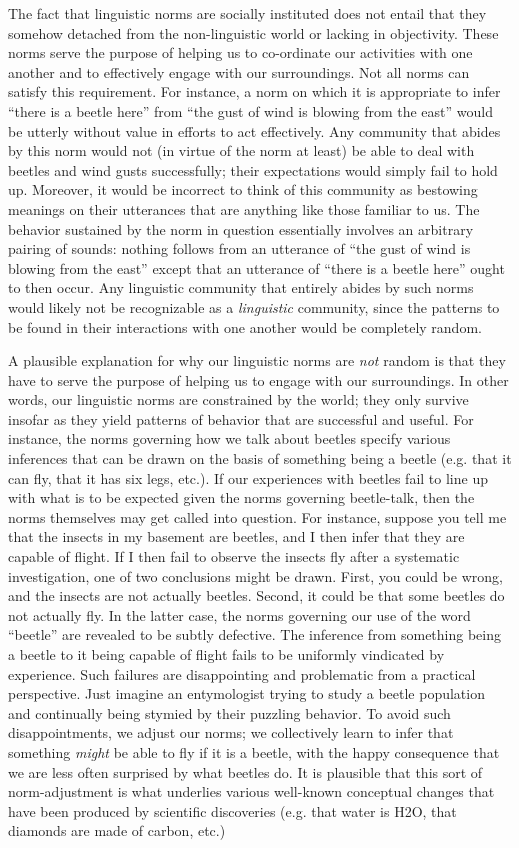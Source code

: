 The fact that linguistic norms are socially instituted does not entail that they somehow detached from the non-linguistic world or lacking in objectivity. These norms serve the purpose of helping us to co-ordinate our activities with one another and to effectively engage with our surroundings. Not all norms can satisfy this requirement. For instance, a norm on which it is appropriate to infer ``there is a beetle here'' from ``the gust of wind is blowing from the east'' would be utterly without value in efforts to act effectively. Any community that abides by this norm would not (in virtue of the norm at least) be able to deal with beetles and wind gusts successfully; their expectations would simply fail to hold up. Moreover, it would be incorrect to think of this community as bestowing meanings on their utterances that are anything like those familiar to us. The behavior sustained by the norm in question essentially involves an arbitrary pairing of sounds: nothing follows from an utterance of ``the gust of wind is blowing from the east'' except that an utterance of ``there is a beetle here'' ought to then occur. Any linguistic community that entirely abides by such norms would likely not be recognizable as a \textit{linguistic} community, since the patterns to be found in their interactions with one another would be completely random. 

A plausible explanation for why our linguistic norms are \textit{not} random is that they have to serve the purpose of helping us to engage with our surroundings. In other words, our linguistic norms are constrained by the world; they only survive insofar as they yield patterns of behavior that are successful and useful. For instance, the norms governing how we talk about beetles specify various inferences that can be drawn on the basis of something being a beetle (e.g. that it can fly, that it has six legs, etc.). If our experiences with beetles fail to line up with what is to be expected given the norms governing beetle-talk, then the norms themselves may get called into question. For instance, suppose you tell me that the insects in my basement are beetles, and I then infer that they are capable of flight. If I then fail to observe the insects fly after a systematic investigation, one of two conclusions might be drawn. First, you could be wrong, and the insects are not actually beetles. Second, it could be that some beetles do not actually fly. In the latter case, the norms governing our use of the word ``beetle'' are revealed to be subtly defective. The inference from something being a beetle to it  being capable of flight fails to be uniformly vindicated by experience. Such failures are disappointing and problematic from a practical perspective. Just imagine an entymologist trying to study a beetle population and continually being stymied by their puzzling behavior. To avoid such disappointments, we adjust our norms; we collectively learn to infer that something \textit{might} be able to fly if it is a beetle, with the happy consequence that we are less often surprised by what beetles do. It is plausible that this sort of norm-adjustment is what underlies various well-known conceptual changes that have been produced by scientific discoveries (e.g. that water is H2O, that diamonds are made of carbon, etc.)

